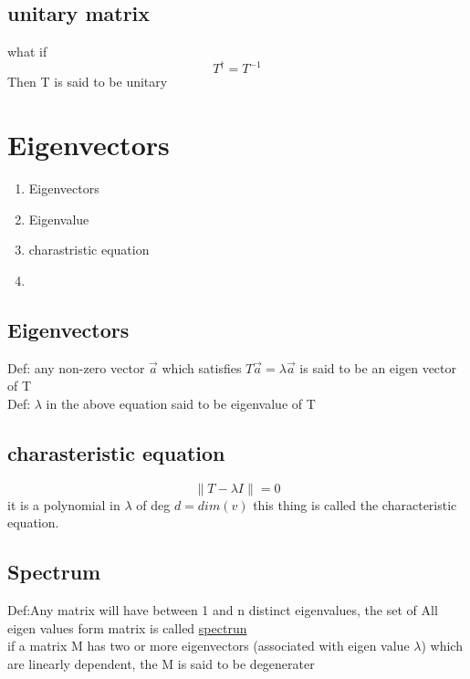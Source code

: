 \documentclass[12pt, a4paper]{article}
\begin{document}
\subsection{unitary matrix}
what if $$T^{\dagger}=T^{-1}$$
Then T is said to be unitary

\section{Eigenvectors}
\begin{enumerate}
\item Eigenvectors
\item Eigenvalue
\item charastristic equation
\item 
\end{enumerate}
\subsection{Eigenvectors}
Def: any non-zero vector $\vec{a}$ which satisfies $T\vec{a}=\lambda \vec{a}$ is said to be an eigen vector of T\\
Def: $\lambda$ in the above equation said to be eigenvalue of T
\subsection{charasteristic equation}
$$\|T-\lambda I\|=0$$
it is a polynomial in $\lambda$ of deg $d=dim(v)$ this thing is called the characteristic equation.\\
\subsection{Spectrum}
Def:Any matrix will have between 1 and n distinct eigenvalues, the set of All eigen values form matrix is called \underline{spectrun}\\
if a matrix M has two or more eigenvectors (associated with eigen value $\lambda$) which are linearly dependent, the M is said to be degenerater
\end{document}
